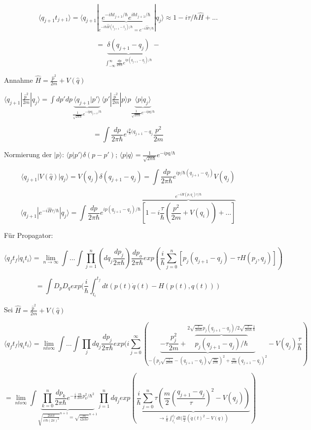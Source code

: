 \[ \langle q_{j+1}t_{j+1}\rangle = \langle q_{j+1}|\underbrace{e^{-i\hbar t_{j+1}/\hbar}e^{i\hbar t_{j+1}/\hbar}}_{e^{-i\hbar \hat H (t_{j+1}-t_j)/\hbar}=e^{-i\hat H\tau/\hbar}}|q_j\rangle\approx 1-i\tau/\hbar \hat H + ... \]

\[=\underbrace{\delta(q_{j+1}-q_j)}_{\int_{-\infty}^{\infty}\frac{dp}{2\pi\hbar}e^{ip(q_{j+1}-q_j)/\hbar}}-\]

Annahme \(\hat H = \frac{\hat p^2}{2m}+V(\hat q)\)

\( \langle q_{j+1}|  \frac{\hat p^2}{2m} |q_j\rangle =\int dp'dp \underbrace{\langle q_{j+1}|p'\rangle}_{\frac{1}{\sqrt{2\pi\hbar}}e^{-ipq_{j+1}/\hbar}} \langle p'| \frac{\hat p^2}{2m} |p\rangle p \underbrace{\langle p|q_j\rangle}_{ \frac{1}{\sqrt{2\pi\hbar}}e^{-ipq/\hbar}} \)

\[  = \int \frac{dp}{2\pi \hbar}e^{i\frac{p}{\hbar}(q_{j+1}-q_j}\frac{p^2}{2m}\]


Normierung der \(|p\rangle \): \(\langle p|p'\rangle \delta (p-p')\); \(\langle p|q\rangle = \frac{1}{\sqrt{2\pi\hbar}}e^{-ipq/\hbar}\)


\[ \langle q_{j+1}|V(\hat q)| q_j\rangle  = V(q_j) \delta(q_{j+1}-q_j) = \int \frac{dp}{2\pi \hbar}e^{ip/\hbar(q_{j+1}-q_j)}V(q_j) \]

\[\langle q_{j+1}|e^{-i\hat H\tau/\hbar}|q_j\rangle = \int  \frac{dp}{2\pi \hbar} e^{ip(q_{j+1}-q_j)/\hbar}\overbrace{[1-i\frac{\tau}{\hbar}(\frac{p^2}{2m}+V(q_i))+...]}^{e^{-iH(p,q_i)\tau/\hbar}}\]

Für Propagator: 

\[\langle q_ft_f|q_it_i\rangle = \lim_{n \to \infty}\int...\int \prod_{j=1}^n(dq_j\frac{dp_j}{2\pi\hbar})\frac{dp_o}{2\pi\hbar}exp(\frac{i}{\hbar}\sum_{j=0}^n[p_j(q_{j+1}-q_j)-\tau H(p_j,q_j)])\]

\[= \int D_pD_q exp(\frac{i}{\hbar}\int_{t_i}^{t_f}dt(p(t)\dot q(t) - H(p(t),q(t)))\]

Sei \(\hat H = \frac{\hat p^2}{2m}+V(\hat q)\)

\[\langle q_f t_f|q_it_i\rangle = \lim_{n to \infty}\int...\int \prod_j dq_j \frac{dp_j}{2\pi \hbar} exp(i\sum_{j=0}^\infty(\underbrace{-\tau\frac{p^2_j}{2m}+\overbrace{p_j(q_{j+1}-q_j)/\hbar}^{2\sqrt{\frac{\tau}{2m\hbar}}p_j(q_{j+1}-q_j)/2\sqrt{\frac{\tau}{2m\hbar}}\frac{1}{\hbar}}}_{-(p_j\sqrt{\frac{\tau}{2m\hbar}}-(q_{j+1}-q_j)\sqrt{\frac{m}{2\tau\hbar}} )^2+\frac{m}{2\tau\hbar}(q_{j+1}-q_j)^2} - V(q_j)\frac{\tau}{\hbar})\]

\[= \lim_{n to \infty}\int \underbrace{\prod_{k=0}^n \frac{dp_k}{2\pi \hbar}e^{-\frac{i}{\hbar}\frac{\tau\hbar}{2m}p^2_k/\hbar^2}}_{\sqrt{\frac{2in\pi}{i\tau \hbar(2\pi)^2}}^{n+1}=\sqrt{\frac{m}{i2\pi\hbar\tau}}^{n+1}}\prod_{j=1}^n dq_j exp(\underbrace{\frac{i}{\hbar}\sum_{j=0}^n\tau(\frac{m}{2}(\frac{q_{j+1}-q_j}{\tau})^2-V(q_j))}_{\rightarrow \frac{i}{\hbar}\int_{t_i}^{t_f}dt(\frac{m}{2}(\dot q(t)^2-V(q))})\]


